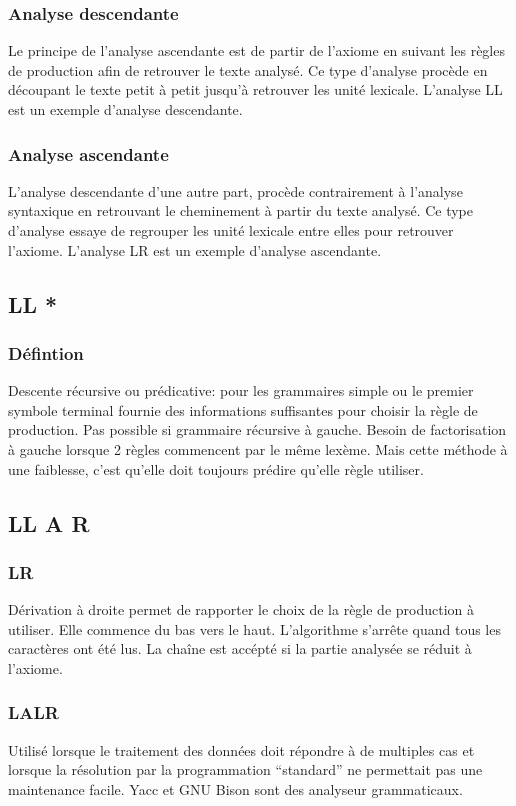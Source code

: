 \documentclass{article}
\begin{document}
\subsubsection{Analyse descendante}
	Le principe de l’analyse ascendante  est de partir de l’axiome en suivant les règles de production afin de retrouver le texte analysé. Ce type d’analyse procède en découpant le texte petit à petit jusqu'à retrouver les unité lexicale. L’analyse LL est un exemple d’analyse descendante.
\subsubsection{Analyse ascendante}
	L’analyse descendante d’une autre part, procède contrairement à l’analyse syntaxique en retrouvant le cheminement à partir du texte analysé. Ce type d’analyse essaye de regrouper les unité lexicale entre elles pour retrouver l’axiome. L’analyse LR est un exemple d’analyse ascendante.

\subsection{LL *}
\subsubsection{Défintion}
	Descente récursive ou prédicative: pour les grammaires simple ou le premier symbole terminal fournie des informations suffisantes pour choisir la règle de production.
Pas possible si grammaire récursive à gauche.
Besoin de factorisation à gauche lorsque 2 règles commencent par le même lexème.
Mais cette méthode à une faiblesse, c’est qu’elle doit toujours prédire qu’elle règle utiliser.

\subsection{LL A R}
\subsubsection{LR}
	Dérivation à droite permet de rapporter le choix de la règle de production à utiliser.
Elle commence du bas vers le haut.
L’algorithme s’arrête quand tous les caractères ont été lus. La chaîne est accépté si la partie analysée se réduit à l’axiome. 
\subsubsection{LALR}
	Utilisé lorsque le traitement des données doit répondre à de multiples cas et lorsque la
résolution par la programmation “standard” ne permettait pas une maintenance facile.
Yacc et GNU Bison sont des analyseur grammaticaux.
\end{document}
